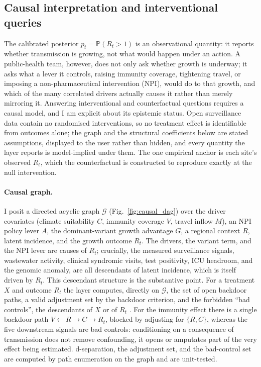 \documentclass[10pt,twocolumn]{article}
\theoremstyle{definition}
\newcommand{\Rt}{R_t}
\newcommand{\Prob}{\mathbb{P}}
\begin{document}
\subsection{Causal interpretation and interventional queries}
\label{sec:causal}

The calibrated posterior $p_t=\Prob(\Rt>1)$ is an observational quantity: it
reports whether transmission is growing, not what would happen under an action.
A public-health team, however, does not only ask whether growth is underway; it
asks what a lever it controls, raising immunity coverage, tightening travel, or
imposing a non-pharmaceutical intervention (NPI), would do to that growth, and
which of the many correlated drivers actually causes it rather than merely
mirroring it. Answering interventional and counterfactual questions requires a
causal model, and I am explicit about its epistemic status. Open surveillance
data contain no randomised interventions, so no treatment effect is identifiable
from outcomes alone; the graph and the structural coefficients below are stated
assumptions, displayed to the user rather than hidden, and every quantity the
layer reports is model-implied under them. The one empirical anchor is each
site's observed $\Rt$, which the counterfactual is constructed to reproduce
exactly at the null intervention.

\paragraph{Causal graph.} I posit a directed acyclic graph $\mathcal G$
(Fig.~\ref{fig:causal_dag}) over the driver covariates (climate suitability
$C$, immunity coverage $V$, travel inflow $M$), an NPI policy lever $A$, the
dominant-variant growth advantage $G$, a regional context $R$, latent incidence,
and the growth outcome $\Rt$. The drivers, the variant term, and the NPI lever
are causes of $\Rt$; crucially, the measured surveillance signals, wastewater
activity, clinical syndromic visits, test positivity, ICU headroom, and the
genomic anomaly, are all descendants of latent incidence, which is itself driven
by $\Rt$. This descendant structure is the substantive point. For a treatment
$X$ and outcome $\Rt$ the layer computes, directly on $\mathcal G$, the set of
open backdoor paths, a valid adjustment set by the backdoor criterion, and the
forbidden ``bad controls'', the descendants of $X$ or of $\Rt$
\citep{pearl2009,cinelli2022}. For the immunity effect there is a single backdoor
path $V \leftarrow R \rightarrow C \rightarrow \Rt$, blocked by adjusting for
$\{R,C\}$, whereas the five downstream signals are bad controls: conditioning on
a consequence of transmission does not remove confounding, it opens or amputates
part of the very effect being estimated. d-separation, the adjustment set, and
the bad-control set are computed by path enumeration on the graph and are
unit-tested.
\end{document}
